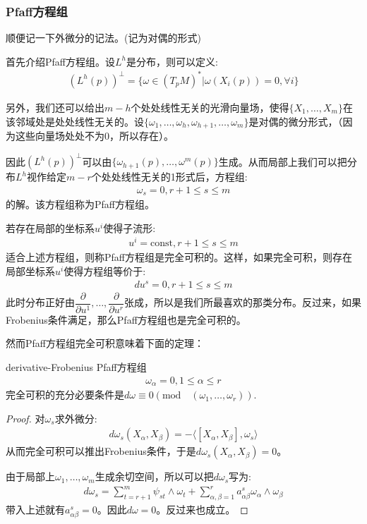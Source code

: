 \documentclass{package/fancy-book}
\begin{document}
\subsubsection{Pfaff方程组}
顺便记一下外微分的记法。(记为对偶的形式)

首先介绍Pfaff方程组。设$L^h$是分布，则可以定义:
\begin{align}
    (L^h(p))^{\perp}=\{\omega \in (T_pM)^*|\omega(X_i(p))=0,\forall i\}
\end{align}

另外，我们还可以给出$m-h$个处处线性无关的光滑向量场，使得$\{X_1,\dots,X_m\}$在该邻域处是处处线性无关的。设$\{\omega_1,\dots,\omega_h,\omega_{h+1},\dots,\omega_m\}$是对偶的微分形式，（因为这些向量场处处不为0，所以存在）。

因此$(L^h(p))^{\perp}$可以由$\{\omega_{h+1}(p),\dots,\omega^m(p)\}$生成。从而局部上我们可以把分布$L^h$视作给定$m-r$个处处线性无关的1形式后，方程组:
\begin{align}
    \omega_s=0,r+1\leq s \leq m
\end{align}
的解。该方程组称为Pfaff方程组。

\begin{definition}{}
    若存在局部的坐标系$u^i$使得子流形:
    \begin{align}
        u^i=\mathrm{const},r+1\leq s \leq m
    \end{align}
    适合上述方程组，则称Pfaff方程组是完全可积的。这样，如果完全可积，则存在局部坐标系$u^i$使得方程组等价于:
    \begin{align}
        du^s=0,r+1\leq s \leq m
    \end{align}
    此时分布正好由$\dfrac{\partial}{\partial u^1},\dots,\dfrac{\partial}{\partial u^r}$张成，所以是我们所最喜欢的那类分布。反过来，如果Frobenius条件满足，那么Pfaff方程组也是完全可积的。
\end{definition}
然而Pfaff方程组完全可积意味着下面的定理：
\begin{theorem}[Frobenius定理]{derivative-Frobenius}
    Pfaff方程组
    \begin{align}
        \omega_\alpha=0,1\leq \alpha \leq r
    \end{align}
    完全可积的充分必要条件是$d\omega \equiv0 (\mathrm{mod}\quad (\omega_1,\dots,\omega_r))$.
\end{theorem}
\begin{proof}
    对$\omega_s$求外微分:
    \begin{align}
        d\omega_s(X_\alpha,X_\beta)=-\langle [X_\alpha,X_\beta],\omega_s\rangle
    \end{align}
    从而完全可积可以推出Frobenius条件，于是$d\omega_s(X_\alpha,X_\beta)=0$。

    由于局部上$\omega_1,\dots,\omega_m$生成余切空间，所以可以把$d\omega_s$写为:
    \begin{align}
        d\omega_s=\sum_{t=r+1}^m \psi_{st}\wedge \omega_t+\sum_{\alpha,\beta=1}^r a_{\alpha\beta}^s \omega_\alpha \wedge \omega_\beta
    \end{align}
    带入上述就有$a_{\alpha\beta}^s=0$。因此$d\omega=0$。反过来也成立。
\end{proof}
\end{document}
